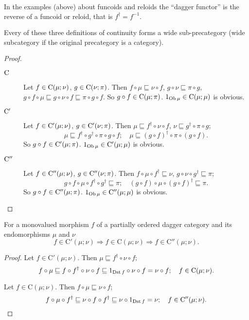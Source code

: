 \begin{rem}
In the examples (above) about funcoids and reloids the ``dagger functor''
is the reverse of a funcoid or reloid, that is $f^{\dagger}=f^{-1}$.\end{rem}
\begin{prop}
Every of these three definitions of continuity forms a wide sub-precategory
(wide subcategory if the original precategory is a category).\end{prop}
\begin{proof}
~
\begin{description}
\item [{$\mathrm{C}$}] Let $f\in\mathrm{C}(\mu;\nu)$, $g\in\mathrm{C}(\nu;\pi)$.
Then $f\circ\mu\sqsubseteq\nu\circ f$, $g\circ\nu\sqsubseteq\pi\circ g$,
$g\circ f\circ\mu\sqsubseteq g\circ\nu\circ f\sqsubseteq\pi\circ g\circ f$.
So $g\circ f\in\mathrm{C}(\mu;\pi)$. $1_{\operatorname{Ob}\mu}\in\mathrm{C}(\mu;\mu)$
is obvious.
\item [{$\mathrm{C}'$}] Let $f\in\mathrm{C}'(\mu;\nu)$, $g\in\mathrm{C}'(\nu;\pi)$.
Then $\mu\sqsubseteq f^{\dagger}\circ\nu\circ f$, $\nu\sqsubseteq g^{\dagger}\circ\pi\circ g$;
\[
\mu\sqsubseteq f^{\dagger}\circ g^{\dagger}\circ\pi\circ g\circ f;\quad\mu\sqsubseteq(g\circ f)^{\dagger}\circ\pi\circ(g\circ f).
\]
So $g\circ f\in\mathrm{C}'(\mu;\pi)$. $1_{\operatorname{Ob}\mu}\in\mathrm{C}'(\mu;\mu)$
is obvious.
\item [{$\mathrm{C}''$}] Let $f\in\mathrm{C}''(\mu;\nu)$, $g\in\mathrm{C}''(\nu;\pi)$.
Then $f\circ\mu\circ f^{\dagger}\sqsubseteq\nu$, $g\circ\nu\circ g^{\dagger}\sqsubseteq\pi$;
\[
g\circ f\circ\mu\circ f^{\dagger}\circ g^{\dagger}\sqsubseteq\pi;\quad(g\circ f)\circ\mu\circ(g\circ f)^{\dagger}\sqsubseteq\pi.
\]
So $g\circ f\in\mathrm{C}''(\mu;\pi)$. $1_{\operatorname{Ob}\mu}\in\mathrm{C}''(\mu;\mu)$
is obvious.
\end{description}
\end{proof}
\begin{prop}
For a monovalued morphism $f$ of a partially ordered dagger category
and its endomorphisms $\mu$ and $\nu$ 
\[
f\in\mathrm{C}'(\mu;\nu)\Rightarrow f\in\mathrm{C}(\mu;\nu)\Rightarrow f\in\mathrm{C}''(\mu;\nu).
\]
\end{prop}
\begin{proof}
Let $f\in\mathrm{C}'(\mu;\nu)$. Then $\mu\sqsubseteq f^{\dagger}\circ\nu\circ f$;
\[
f\circ\mu\sqsubseteq f\circ f^{\dagger}\circ\nu\circ f\sqsubseteq1_{\operatorname{Dst} f}\circ\nu\circ f=\nu\circ f;\quad f\in\mathrm{C}(\mu;\nu).
\]


Let $f\in\mathrm{C}(\mu;\nu)$. Then $f\circ\mu\sqsubseteq\nu\circ f$;
\[
f\circ\mu\circ f^{\dagger}\sqsubseteq\nu\circ f\circ f^{\dagger}\sqsubseteq\nu\circ1_{\operatorname{Dst} f}=\nu;\quad f\in\mathrm{C}''(\mu;\nu).
\]
\end{proof}
